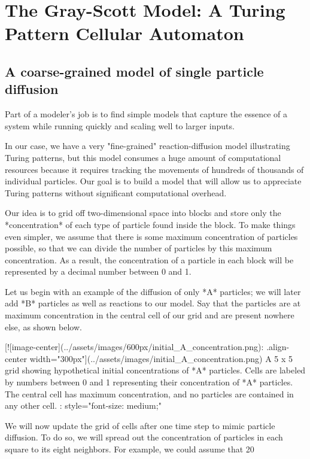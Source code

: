 {{{{{{{{\FloatBarrier
{}

\section{The Gray-Scott Model: A Turing Pattern Cellular Automaton}
\label{sec:the_gray-scott_model:_a_turing_pattern_cellular_automaton}

\subsection{A coarse-grained model of single particle diffusion}


Part of a modeler's job is to find simple models that capture the essence of a system while running quickly and scaling well to larger inputs.

In our case, we have a very "fine-grained" reaction-diffusion model illustrating Turing patterns, but this model consumes a huge amount of computational resources because it requires tracking the movements of hundreds of thousands of individual particles. Our goal is to build a model that will allow us to appreciate Turing patterns without significant computational overhead.

Our idea is to grid off two-dimensional space into blocks and store only the *concentration* of each type of particle found inside the block. To make things even simpler, we assume that there is some maximum concentration of particles possible, so that we can divide the number of particles by this maximum concentration. As a result, the concentration of a particle in each block will be represented by a decimal number between 0 and 1.

Let us begin with an example of the diffusion of only *A* particles; we will later add *B* particles as well as reactions to our model. Say that the particles are at maximum concentration in the central cell of our grid and are present nowhere else, as shown below.

[![image-center](../assets/images/600px/initial_A_concentration.png){: .align-center width="300px"}](../assets/images/initial_A_concentration.png)
A 5 x 5 grid showing hypothetical initial concentrations of *A* particles. Cells are labeled by numbers between 0 and 1 representing their concentration of *A* particles. The central cell has maximum concentration, and no particles are contained in any other cell.
{: style="font-size: medium;"}

We will now update the grid of cells after one time step to mimic particle diffusion. To do so, we will spread out the concentration of particles in each square to its eight neighbors. For example, we could assume that 20%

}}}}}}}}
